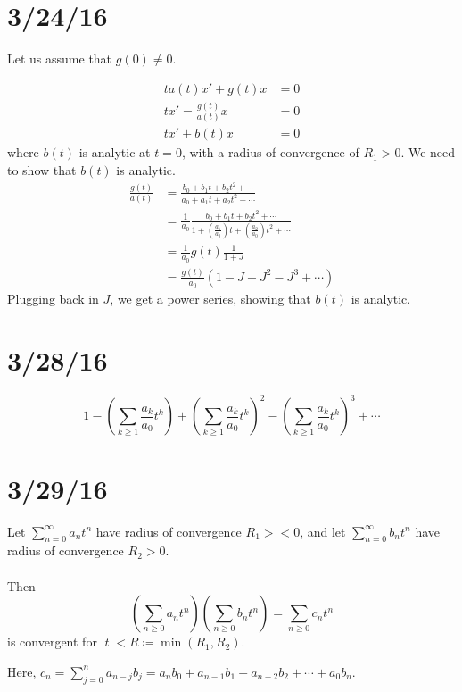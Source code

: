 \documentclass[12pt]{article}
\begin{document}
\section{3/24/16}
Let us assume that $g(0) \neq 0$.

\[ 
\begin{aligned}
ta(t)x'  + g(t)x &= 0 \\
tx' = \frac{g(t)}{a(t)}x &= 0 \\
tx' + b(t)x &= 0
\end{aligned}
\]
where $b(t)$ is analytic at $t=0$, with a radius of convergence of $R_1 > 0$. We need to show that $b(t)$ is analytic.
\[ 
\begin{aligned}
\frac{g(t)}{a(t)} &= \frac{b_0 + b_1t + b_2t^2 + \cdots}{a_0 + a_1t + a_2t^2 + \cdots} \\
&= \frac{1}{a_0}\frac{b_0 + b_1t + b_2t^2 + \cdots}{1 + \left(\frac{a_1}{a_0}\right)t + \left(\frac{a_2}{a_0}\right)t^2 + \cdots} \\
&= \frac{1}{a_0}g(t)\frac{1}{1+J} \\
&= \frac{g(t)}{a_0}(1-J + J^2 - J^3 + \cdots)
\end{aligned}
\]
Plugging back in $J$, we get a power series, showing that $b(t)$ is analytic.

\section{3/28/16}


\[ 1 - \left(\sum_{k\ge 1}\frac{a_k}{a_0}t^k\right) + \left(\sum_{k \ge 1}\frac{a_k}{a_0}t^k\right)^2 - \left(\sum_{k\ge 1}\frac{a_k}{a_0}t^k\right)^3 + \cdots \]

\section{3/29/16}

\begin{lemma}
Let $\displaystyle\sum_{n=0}^{\infty} a_nt^n$ have radius of convergence $R_1 >< 0$, and let $\displaystyle\sum_{n=0}^{\infty}b_nt^n$ have radius of convergence $R_2 > 0$. \\ \\
Then \[ \left(\sum_{n\ge0}a_nt^n\right)\left(\sum_{n\ge0}b_nt^n\right) = \sum_{n\ge0}c_nt^n\] is convergent for $|t| < R \coloneqq \min(R_1,R_2)$.
\end{lemma}

Here, $c_n = \displaystyle\sum_{j=0}^n a_{n-j}b_j = a_nb_0 + a_{n-1}b_1 + a_{n-2}b_2 + \cdots + a_0b_n$.
\end{document}
